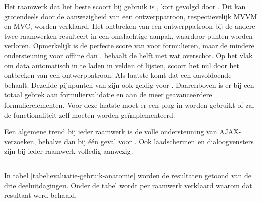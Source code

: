 Het raamwerk dat het beste scoort bij gebruik is \kendo{}, kort gevolgd door \st{}.
Dit kan grotendeels door de aanwezigheid van een ontwerppatroon, respectievelijk MVVM en MVC, worden verklaard.
Het ontbreken van een ontwerppatroon bij de andere twee raamwerken resulteert in een omslachtige aanpak, waardoor punten worden verloren.
Opmerkelijk is de perfecte score van \kendo{} voor formulieren, maar de mindere ondersteuning voor offline dan \st{}.
\jqm{} behaalt de helft met wat overschot.
Op het vlak om data automatisch in te laden in velden of lijsten, scoort het nul door het ontbreken van een ontwerppatroon. 
Als laatste komt \lungo{} dat een onvoldoende behaalt.
Dezelfde pijnpunten van \jqm{} zijn ook geldig voor \lungo{}.
Daarenboven is er bij \lungo{} een totaal gebrek aan formuliervalidatie en aan de meer geavanceerdere formulierelementen.
Voor deze laatste moet er een plug-in worden gebruikt of zal de functionaliteit zelf moeten worden geïmplementeerd. 

Een algemene trend bij ieder raamwerk is de volle ondersteuning van AJAX-verzoeken, behalve dan bij één geval voor \lungo{}.
Ook laadschermen en dialoogvensters zijn bij ieder raamwerk volledig aanwezig.



\subsection{}
\label{sec:evaluatie-gebruik-anatomie}

In tabel \ref{tabel:evaluatie-gebruik-anatomie} worden de resultaten getoond van de drie deeluitdagingen.
Onder de tabel wordt per raamwerk verklaard waarom dat resultaat werd behaald.

\begin{table}
\centering
{}
\caption{Gebruik van .}
\label{tabel:evaluatie-gebruik-anatomie}
\end{table}


